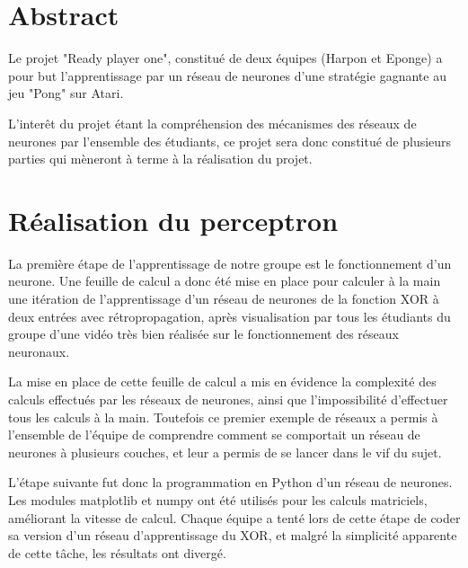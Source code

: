 \documentclass[
    10pt,
    a4paper,
    oneside,
    headinclude,footinclude,
    BCOR=5mm,
]{scrartcl}
\title{\normalfont{\spacedallcaps{Ready-Player-One}}}
\subtitle{Rapport du groupe Harpon}
\author{Martin Lehoux, Pierre Biret \and Sacha Seksik, Loïc Audoin}
\date{\today}
\begin{document}
    
\renewcommand{\sectionmark}[1]{\markright{\spacedlowsmallcaps{#1}}}
\lehead{\mbox{\llap{\small\thepage\kern1em\color{halfgray} \vline}\color{halfgray}\hspace{0.5em}\rightmark\hfil}}
\pagestyle{scrheadings}

\maketitle

\section*{Abstract}
Le projet "Ready player one", constitué de deux équipes (Harpon et Eponge) a pour but l'apprentissage par un réseau de neurones d'une stratégie gagnante au
jeu "Pong" sur Atari.

L'interêt du projet étant la compréhension des mécanismes des réseaux de neurones par l'ensemble des étudiants, ce projet sera donc constitué de plusieurs
parties qui mèneront à terme à la réalisation du projet.



\newpage
\section{Réalisation du perceptron}

La première étape de l'apprentissage de notre groupe est le fonctionnement d'un neurone. Une feuille de calcul a donc été mise en place pour calculer à la
main une itération de l'apprentissage d'un réseau de neurones de la fonction XOR à deux entrées avec rétropropagation, après visualisation par tous les
étudiants du groupe d'une vidéo très bien réalisée sur le fonctionnement des réseaux neuronaux.

La mise en place de cette feuille de calcul a mis en évidence la complexité des calculs effectués par les réseaux de neurones, ainsi que l'impossibilité
d'effectuer tous les calculs à la main. Toutefois ce premier exemple de réseaux a permis à l'ensemble de l'équipe de comprendre comment se comportait un
réseau de neurones à plusieurs couches, et leur a permis de se lancer dans le vif du sujet. 

L'étape suivante fut donc la programmation en Python d'un réseau de neurones. Les modules matplotlib et numpy ont été utilisés pour les calculs matriciels,
améliorant la vitesse de calcul. Chaque équipe a tenté lors de cette étape de coder sa version d'un réseau d'apprentissage du XOR, et malgré la simplicité
apparente de cette tâche, les résultats ont divergé.
\end{document}
